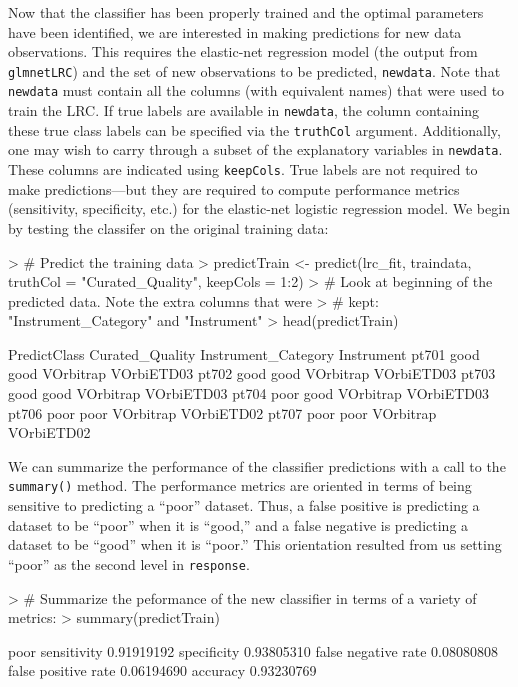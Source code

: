\documentclass{article}
\begin{document}
Now that the classifier has been properly trained and the optimal parameters have been identified, we are 
interested in making predictions for new data observations. This requires the elastic-net regression model 
(the output from {\tt glmnetLRC}) and the set of new observations to be predicted, {\tt newdata}.  
Note that {\tt newdata} must contain all the columns (with equivalent names) that were used to train the LRC.
If true labels are available in {\tt newdata}, the column containing 
these true class labels can be specified via the 
{\tt truthCol} argument. Additionally, one may wish to carry through a subset of the explanatory variables in 
{\tt newdata}.  These columns are indicated using {\tt keepCols}.   True labels are not required to make 
predictions---but they are required to compute performance metrics (sensitivity, specificity, etc.) for the 
elastic-net logistic regression model. We begin by testing the classifer on the original training data:
\begin{Schunk}
\begin{Sinput}
> # Predict the training data
> predictTrain <- predict(lrc_fit, traindata, truthCol = "Curated_Quality", keepCols = 1:2)
> # Look at beginning of the predicted data.  Note the extra columns that were 
> # kept:  "Instrument_Category" and "Instrument"
> head(predictTrain)
\end{Sinput}
\begin{Soutput}
      PredictClass Curated_Quality Instrument_Category Instrument
pt701         good            good           VOrbitrap VOrbiETD03
pt702         good            good           VOrbitrap VOrbiETD03
pt703         good            good           VOrbitrap VOrbiETD03
pt704         poor            good           VOrbitrap VOrbiETD03
pt706         poor            poor           VOrbitrap VOrbiETD02
pt707         poor            poor           VOrbitrap VOrbiETD02
\end{Soutput}
\end{Schunk}
\noindent We can summarize the performance of the classifier predictions with a call to the {\tt summary()} method.
The performance metrics are oriented in terms of being sensitive to predicting a ``poor'' dataset.  Thus, a 
false positive is predicting a dataset to be ``poor'' when it is ``good,'' and a false negative is predicting a 
dataset to be ``good'' when it is ``poor.''  This orientation resulted from us setting ``poor'' as the second
level in {\tt response}.
\begin{Schunk}
\begin{Sinput}
> # Summarize the peformance of the new classifier in terms of a variety of metrics:
> summary(predictTrain)
\end{Sinput}
\begin{Soutput}
                          poor
sensitivity         0.91919192
specificity         0.93805310
false negative rate 0.08080808
false positive rate 0.06194690
accuracy            0.93230769
\end{Soutput}
\end{Schunk}
\end{document}
